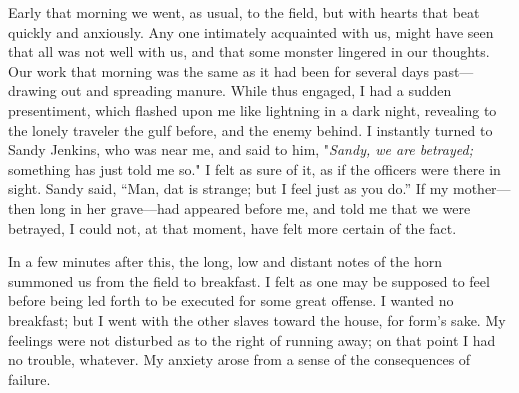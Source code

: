 Early that morning we went, as usual, to the field, but with hearts that
beat quickly and anxiously. Any one intimately acquainted with us, might
have seen that all was not well with us, and that some monster lingered
in our thoughts. Our work that morning was the same as it had been for
several days past---drawing out and spreading manure. While thus
engaged, I had a sudden presentiment, which flashed upon me like
lightning in a dark night, revealing to the lonely traveler the gulf
before, and the enemy behind. I instantly turned to Sandy Jenkins, who
was near me, and said to him, "\emph{Sandy, we are betrayed;} something
has just told me so." I felt as sure of it, as if the officers were
there in sight. Sandy said, ``Man, dat is strange; but I feel just as
you do.'' If my mother---then long in her grave---had appeared {}before
me, and told me that we were betrayed, I could not, at that moment, have
felt more certain of the fact.

In a few minutes after this, the long, low and distant notes of the horn
summoned us from the field to breakfast. I felt as one may be supposed
to feel before being led forth to be executed for some great offense. I
wanted no breakfast; but I went with the other slaves toward the house,
for form's sake. My feelings were not disturbed as to the right of
running away; on that point I had no trouble, whatever. My anxiety arose
from a sense of the consequences of failure.

